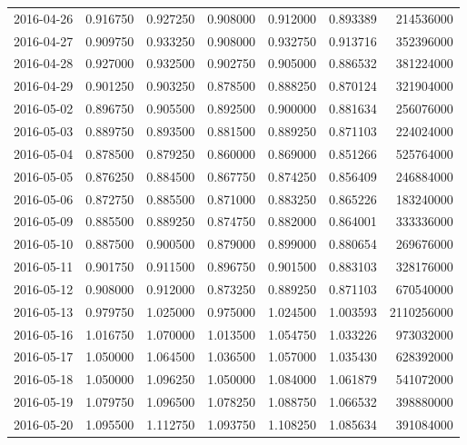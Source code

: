 \begin{tabular}{lrrrrrr}
2016-04-26 &    0.916750 &    0.927250 &    0.908000 &    0.912000 &    0.893389 &   214536000 \\
2016-04-27 &    0.909750 &    0.933250 &    0.908000 &    0.932750 &    0.913716 &   352396000 \\
2016-04-28 &    0.927000 &    0.932500 &    0.902750 &    0.905000 &    0.886532 &   381224000 \\
2016-04-29 &    0.901250 &    0.903250 &    0.878500 &    0.888250 &    0.870124 &   321904000 \\
2016-05-02 &    0.896750 &    0.905500 &    0.892500 &    0.900000 &    0.881634 &   256076000 \\
2016-05-03 &    0.889750 &    0.893500 &    0.881500 &    0.889250 &    0.871103 &   224024000 \\
2016-05-04 &    0.878500 &    0.879250 &    0.860000 &    0.869000 &    0.851266 &   525764000 \\
2016-05-05 &    0.876250 &    0.884500 &    0.867750 &    0.874250 &    0.856409 &   246884000 \\
2016-05-06 &    0.872750 &    0.885500 &    0.871000 &    0.883250 &    0.865226 &   183240000 \\
2016-05-09 &    0.885500 &    0.889250 &    0.874750 &    0.882000 &    0.864001 &   333336000 \\
2016-05-10 &    0.887500 &    0.900500 &    0.879000 &    0.899000 &    0.880654 &   269676000 \\
2016-05-11 &    0.901750 &    0.911500 &    0.896750 &    0.901500 &    0.883103 &   328176000 \\
2016-05-12 &    0.908000 &    0.912000 &    0.873250 &    0.889250 &    0.871103 &   670540000 \\
2016-05-13 &    0.979750 &    1.025000 &    0.975000 &    1.024500 &    1.003593 &  2110256000 \\
2016-05-16 &    1.016750 &    1.070000 &    1.013500 &    1.054750 &    1.033226 &   973032000 \\
2016-05-17 &    1.050000 &    1.064500 &    1.036500 &    1.057000 &    1.035430 &   628392000 \\
2016-05-18 &    1.050000 &    1.096250 &    1.050000 &    1.084000 &    1.061879 &   541072000 \\
2016-05-19 &    1.079750 &    1.096500 &    1.078250 &    1.088750 &    1.066532 &   398880000 \\
2016-05-20 &    1.095500 &    1.112750 &    1.093750 &    1.108250 &    1.085634 &   391084000 \\

\end{tabular}
